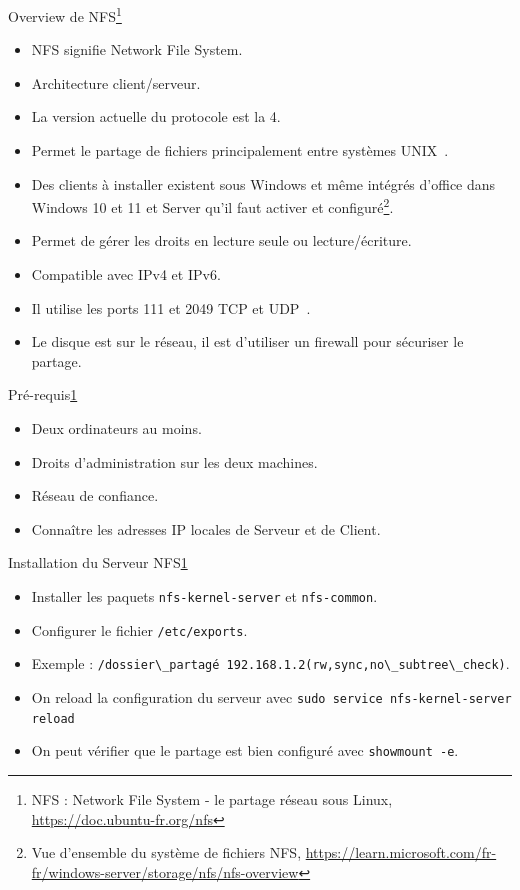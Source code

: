 \documentclass{beamer}
\begin{document}
    \begin{frame}{Overview de NFS\footnote{\label{nfs}NFS : Network File System - le partage réseau sous Linux, \url{https://doc.ubuntu-fr.org/nfs}}}
        \begin{itemize}
            \item NFS signifie Network File System.
            \item Architecture client/serveur.
            \item La version actuelle du protocole est la 4.
            \item Permet le partage de fichiers principalement entre systèmes UNIX~.
            \item Des clients à installer existent sous Windows et même intégrés d'office dans Windows 10 et 11 et Server qu'il faut activer et configuré\footnote{Vue d’ensemble du système de fichiers NFS, \url{https://learn.microsoft.com/fr-fr/windows-server/storage/nfs/nfs-overview}}.
            \item Permet de gérer les droits en lecture seule ou lecture/écriture.
            \item Compatible avec IPv4 et IPv6.
            \item Il utilise les ports 111 et 2049 TCP et UDP~.
            \item Le disque est sur le réseau, il est d'utiliser un firewall pour sécuriser le partage.
        \end{itemize}
    \end{frame}

    \begin{frame}{Pré-requis\cref{nfs}}
        \begin{itemize}
            \item Deux ordinateurs au moins.
            \item Droits d'administration sur les deux machines.
            \item Réseau de confiance.
            \item Connaître les adresses IP locales de Serveur et de Client.
        \end{itemize}
    \end{frame}

    \begin{frame}{Installation du Serveur NFS\cref{nfs}}
        \begin{itemize}
            \item Installer les paquets \lstinline{nfs-kernel-server} et \lstinline{nfs-common}.
            \item Configurer le fichier \lstinline{/etc/exports}.
            \item Exemple : \lstinline{/dossier\_partagé 192.168.1.2(rw,sync,no\_subtree\_check)}.
            \item On reload la configuration du serveur avec \lstinline{sudo service nfs-kernel-server reload}
            \item On peut vérifier que le partage est bien configuré avec \lstinline{showmount -e}.
        \end{itemize}
    \end{frame}
\end{document}
